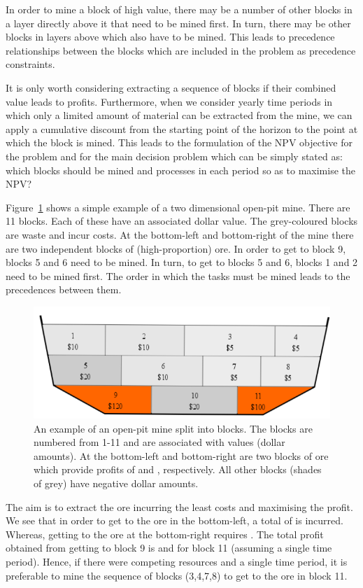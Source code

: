\documentclass[authoryear,11pt,square,number,times,super,comma]{elsarticle}
\begin{document}
In order to mine a block of high value, there may be a number of other blocks in a layer directly above it that need to be mined first. In turn, there may be other blocks in layers above which also have to be mined. This leads to precedence relationships between the blocks which are included in the problem as precedence constraints.

It is only worth considering extracting a sequence of blocks if their combined value leads to profits. Furthermore, when we consider yearly time periods in which only a limited amount of material can be extracted from the mine, we can apply a cumulative discount from the starting point of the horizon to the point at which the block is mined. This leads to the formulation of the NPV objective for the problem and for the main decision problem which can be simply stated as: which blocks should be mined and processes in each period so as to maximise the NPV?

Figure~\ref{fig:pit} shows a simple example of a two dimensional open-pit mine. There are 11 blocks. Each of these have an associated dollar value. The grey-coloured blocks are waste and incur costs. At the bottom-left and bottom-right of the mine there are two independent blocks of (high-proportion) ore. In order to get to block 9, blocks 5 and 6 need to be mined. In turn, to get to blocks 5 and 6, blocks 1 and 2 need to be mined first. The order in which the tasks must be mined leads to the precedences between them. 

\begin{figure}[ht!]
  \includegraphics[width=12cm]{pit}
  \centering
  \caption{An example of an open-pit mine split into blocks. The blocks are numbered from 1-11 and are associated with values (dollar amounts). At the 
  bottom-left and bottom-right are two blocks of ore which provide profits of  and , respectively. All other blocks (shades of grey) 
  have negative dollar amounts.}
  \label{fig:pit}
\end{figure}

The aim is to extract the ore incurring the least costs and maximising the profit. We see that in order to get to the ore in the bottom-left, 
a total of  is incurred. Whereas, getting to the ore at the bottom-right requires . The total profit obtained from getting to block 9 is  and  for block 11 (assuming a single time period). Hence, if there were competing resources and a single time period, it is preferable to mine the sequence of blocks (3,4,7,8) to get to the ore in block 11.   
\end{document}
